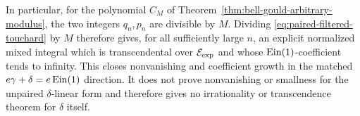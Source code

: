 In particular, for the polynomial \(C_M\) of
Theorem~\ref{thm:bell-gould-arbitrary-modulus}, the two integers \(q_n,p_n\)
are divisible by \(M\).  Dividing
\eqref{eq:paired-filtered-touchard} by \(M\) therefore gives, for all
sufficiently large \(n\), an explicit normalized mixed integral which is
transcendental over \(\mathcal E_{\mathrm{exp}}\) and whose \(\operatorname{Ein}(1)\)-coefficient tends to
infinity.  This closes nonvanishing and coefficient growth in the matched
\(e\gamma+\delta=e\operatorname{Ein}(1)\) direction.  It does not prove nonvanishing or
smallness for the unpaired \(\delta\)-linear form and therefore gives no
irrationality or transcendence theorem for \(\delta\) itself.
